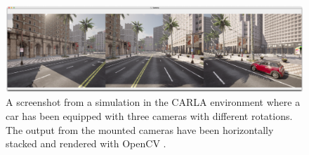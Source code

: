 \begin{figure}[ht]
    \centering
    \includegraphics[width=1.0\textwidth]{figures/carla-3-camera-setup.png}
    \caption[Screenshot from the CARLA simulator.]{A screenshot from a simulation in the CARLA environment where a car has been equipped with three cameras with different rotations. The output from the mounted cameras have been horizontally stacked and rendered with OpenCV \cite{opencv_library}.}
    \label{fig:carla-3-camera-setup}
\end{figure}